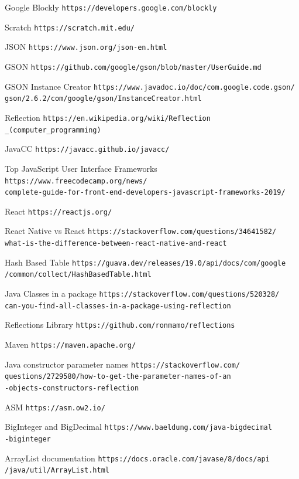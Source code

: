 \documentclass[
11pt,
english,
singlespacing,
headsepline,
]{MastersDoctoralThesis}
\begin{document}


\begin{thebibliography}{20}

Google Blockly \texttt{https://developers.google.com/blockly}

Scratch \texttt{https://scratch.mit.edu/}

JSON \texttt{https://www.json.org/json-en.html}

GSON \texttt{https://github.com/google/gson/blob/master/UserGuide.md}

GSON Instance Creator \texttt{https://www.javadoc.io/doc/com.google.code.gson/\\gson/2.6.2/com/google/gson/InstanceCreator.html}

Reflection \texttt{https://en.wikipedia.org/wiki/Reflection\\\_(computer\_programming)}

JavaCC \texttt{https://javacc.github.io/javacc/}

Top JavaScript User Interface Frameworks  \texttt{https://www.freecodecamp.org/news/\\complete-guide-for-front-end-developers-javascript-frameworks-2019/}

React \texttt{https://reactjs.org/}

React Native vs React \texttt{https://stackoverflow.com/questions/34641582/\\what-is-the-difference-between-react-native-and-react}

Hash Based Table \texttt{https://guava.dev/releases/19.0/api/docs/com/google\\/common/collect/HashBasedTable.html}

Java Classes in a package \texttt{https://stackoverflow.com/questions/520328/\\can-you-find-all-classes-in-a-package-using-reflection}

Reflections Library \texttt{https://github.com/ronmamo/reflections}

Maven \texttt{https://maven.apache.org/}

Java constructor parameter names  \texttt{https://stackoverflow.com/\\questions/2729580/how-to-get-the-parameter-names-of-an\\-objects-constructors-reflection}

ASM \texttt{https://asm.ow2.io/}

BigInteger and BigDecimal \texttt{https://www.baeldung.com/java-bigdecimal\\-biginteger}

ArrayList documentation \texttt{https://docs.oracle.com/javase/8/docs/api\\/java/util/ArrayList.html}

\end{thebibliography}
\end{document}
